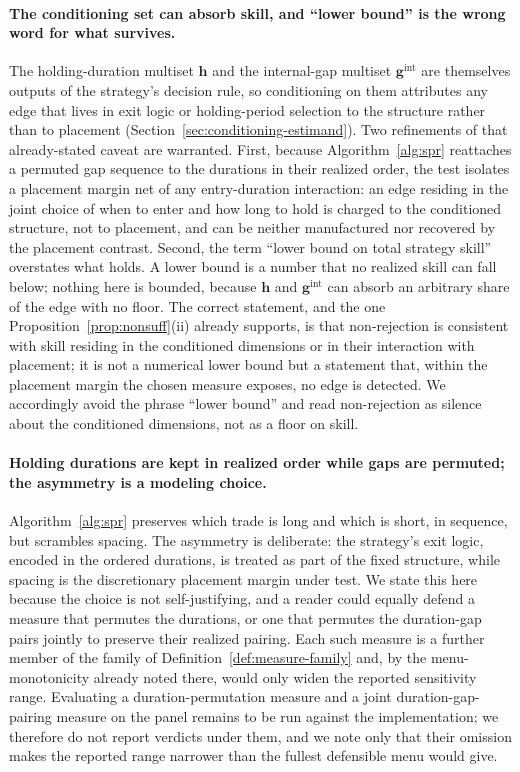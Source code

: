 \documentclass[risks,article,submit,pdftex,oneauthor]{Definitions/mdpi}
\begin{document}
\paragraph{The conditioning set can absorb skill, and ``lower bound'' is the wrong
word for what survives.} The holding-duration multiset $\mathbf{h}$ and the
internal-gap multiset $\mathbf{g}^{\mathrm{int}}$ are themselves outputs of the
strategy's decision rule, so conditioning on them attributes any edge that lives in
exit logic or holding-period selection to the structure rather than to placement
(Section~\ref{sec:conditioning-estimand}). Two refinements of that already-stated
caveat are warranted. First, because Algorithm~\ref{alg:spr} reattaches a permuted gap
sequence to the durations in their realized order, the test isolates a placement
margin net of any entry-duration interaction: an edge residing in the joint choice of
when to enter and how long to hold is charged to the conditioned structure, not to
placement, and can be neither manufactured nor recovered by the placement contrast.
Second, the term ``lower bound on total strategy skill'' overstates what holds. A
lower bound is a number that no realized skill can fall below; nothing here is bounded,
because $\mathbf{h}$ and $\mathbf{g}^{\mathrm{int}}$ can absorb an arbitrary share of
the edge with no floor. The correct statement, and the one
Proposition~\ref{prop:nonsuff}(ii) already supports, is that non-rejection is
consistent with skill residing in the conditioned dimensions or in their interaction
with placement; it is not a numerical lower bound but a statement that, within the
placement margin the chosen measure exposes, no edge is detected. We accordingly avoid
the phrase ``lower bound'' and read non-rejection as silence about the conditioned
dimensions, not as a floor on skill.

\paragraph{Holding durations are kept in realized order while gaps are permuted; the
asymmetry is a modeling choice.} Algorithm~\ref{alg:spr} preserves which trade is long
and which is short, in sequence, but scrambles spacing. The asymmetry is deliberate:
the strategy's exit logic, encoded in the ordered durations, is treated as part of the
fixed structure, while spacing is the discretionary placement margin under test. We
state this here because the choice is not self-justifying, and a reader could equally
defend a measure that permutes the durations, or one that permutes the duration-gap
pairs jointly to preserve their realized pairing. Each such measure is a further member
of the family of Definition~\ref{def:measure-family} and, by the menu-monotonicity
already noted there, would only widen the reported sensitivity range. Evaluating a
duration-permutation measure and a joint duration-gap-pairing measure on the panel
remains to be run against the implementation; we therefore do not report verdicts under
them, and we note only that their omission makes the reported range narrower than the
fullest defensible menu would give.
\end{document}
